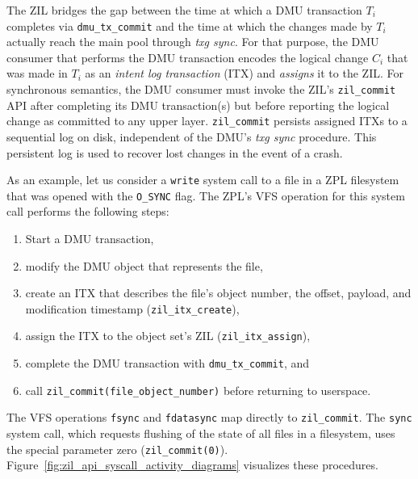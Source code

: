 \documentclass[12pt,a4paper,twoside]{book}
\begin{document}
The ZIL bridges the gap between the time at which a DMU transaction $T_i$ completes via \lstinline{dmu_tx_commit} and the time at which the changes made by $T_i$ actually reach the main pool through \textit{txg sync}.
For that purpose, the DMU consumer that performs the DMU transaction encodes the logical change $C_i$ that was made in $T_i$ as an \textit{intent log transaction} (ITX) and \textit{assigns} it to the ZIL.
For synchronous semantics, the DMU consumer must invoke the ZIL's \lstinline{zil_commit} API after completing its DMU transaction(s) but before reporting the logical change as committed to any upper layer.
\lstinline{zil_commit} persists assigned ITXs to a sequential log on disk, independent of the DMU's \textit{txg sync} procedure.
This persistent log is used to recover lost changes in the event of a crash.

As an example, let us consider a \lstinline{write} system call to a file in a ZPL filesystem that was opened with the \lstinline{O_SYNC} flag.
The ZPL's VFS operation for this system call performs the following steps:
\begin{enumerate}[noitemsep]
    \item Start a DMU transaction,
    \item modify the DMU object that represents the file,
    \item create an ITX that describes the file's object number, the offset, payload, and modification timestamp (\lstinline{zil_itx_create}),
    \item assign the ITX to the object set's ZIL (\lstinline{zil_itx_assign}),
    \item complete the DMU transaction with \lstinline{dmu_tx_commit}, and
    \item \label{vfswrite:step:zilcommit} call \lstinline{zil_commit(file_object_number)} before returning to userspace.
\end{enumerate}
The VFS operations \lstinline{fsync} and \lstinline{fdatasync} map directly to \lstinline{zil_commit}.
The \lstinline{sync} system call, which requests flushing of the state of all files in a filesystem, uses the special parameter zero (\lstinline{zil_commit(0)}).
Figure~\ref{fig:zil_api_syscall_activity_diagrams} visualizes these procedures.
\end{document}
